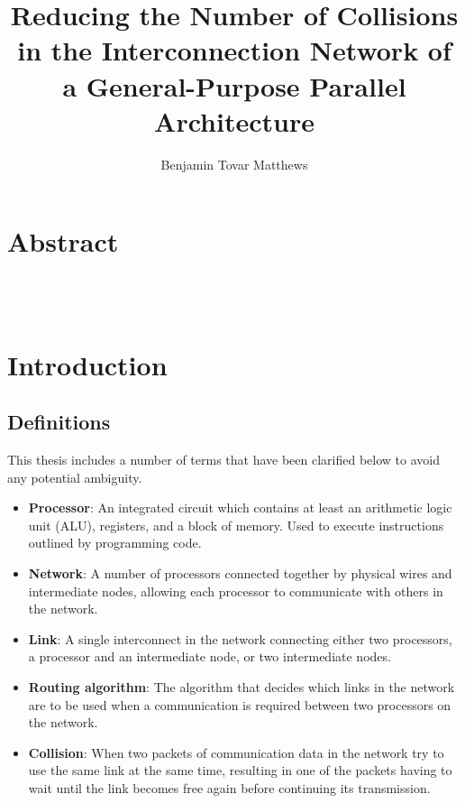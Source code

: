 \documentclass[a4paper, 12pt]{article}
\title{Reducing the Number of Collisions in the Interconnection Network of a General-Purpose Parallel Architecture}
\author{Benjamin Tovar Matthews}
\begin{document}
\setcounter{page}{0}



\newpage
{}
\section*{Abstract}



\newpage
\setcounter{tocdepth}{2}
\tableofcontents
\newpage
\listoffigures
\ \\
\ \\
\listoftables

\newpage
\section{Introduction}

\subsection{Definitions}

This thesis includes a number of terms that have been clarified below to avoid any potential ambiguity.
\begin{itemize}[leftmargin=0cm]

\item[] \textbf{Processor}: An integrated circuit which contains at least an arithmetic logic unit (ALU), registers, and a block of memory. Used to execute instructions outlined by programming code.

\item[] \textbf{Network}: A number of processors connected together by physical wires and intermediate nodes, allowing each processor to communicate with others in the network.

\item[] \textbf{Link}: A single interconnect in the network connecting either two processors, a processor and an intermediate node, or two intermediate nodes.

\item[] \textbf{Routing algorithm}: The algorithm that decides which links in the network are to be used when a communication is required between two processors on the network.

\item[] \textbf{Collision}: When two packets of communication data in the network try to use the same link at the same time, resulting in one of the packets having to wait until the link becomes free again before continuing its transmission.

\end{itemize}
\end{document}
